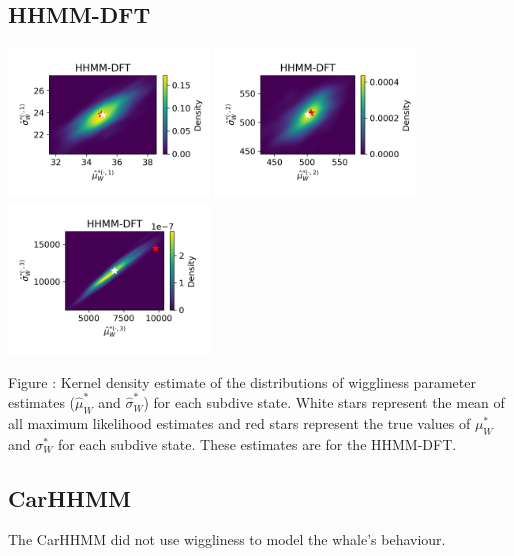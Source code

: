 \documentclass{article}
\begin{document}
        \subsection{HHMM-DFT}
        \begin{center}
        \includegraphics[width=2.1in]{../Plots/hhmm_FV_uncorr_MLE_density_FoVeDBA_0_0.png}
        \includegraphics[width=2.1in]{../Plots/hhmm_FV_uncorr_MLE_density_FoVeDBA_0_1.png}
        \includegraphics[width=2.1in]{../Plots/hhmm_FV_uncorr_MLE_density_FoVeDBA_0_2.png}
        \end{center}
        
        \noindent Figure : Kernel density estimate of the distributions of wiggliness parameter estimates ($\hat \mu^*_W$ and $\hat \sigma^*_W$) for each subdive state. White stars represent the mean of all maximum likelihood estimates and red stars represent the true values of $\mu^*_W$ and $\sigma^*_W$ for each subdive state. These estimates are for the HHMM-DFT.
        \addtocounter{fignum}{1}
        
        \subsection{CarHHMM}
        The CarHHMM did not use wiggliness to model the whale's behaviour.
        
\end{document}

